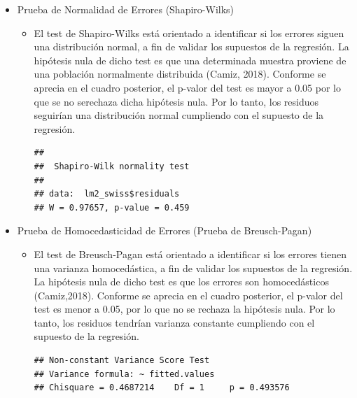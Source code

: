 \documentclass[10pt,a4paper]{article}\usepackage[]{graphicx}\usepackage[]{color}
\makeatletter
\newenvironment{kframe}{%
 \def\at@end@of@kframe{}%
 \ifinner\ifhmode%
  \def\at@end@of@kframe{\end{minipage}}%
  \begin{minipage}{\columnwidth}%
 \fi\fi%
 \def\FrameCommand##1{\hskip\@totalleftmargin \hskip-\fboxsep
 \colorbox{shadecolor}{##1}\hskip-\fboxsep
     \hskip-\linewidth \hskip-\@totalleftmargin \hskip\columnwidth}%
 \MakeFramed {\advance\hsize-\width
   \@totalleftmargin\z@ \linewidth\hsize
   \@setminipage}}%
 {\par\unskip\endMakeFramed%
 \at@end@of@kframe}
\newenvironment{knitrout}{}{} %
\makeatother
\begin{document}
\begin{itemize}
  \item Prueba de Normalidad de Errores (Shapiro-Wilks)
    \begin{itemize}
      \item El test de Shapiro-Wilks está orientado a identificar si los errores siguen una distribución normal, a fin de validar los supuestos de la regresión. La hipótesis nula de dicho test es que una determinada muestra proviene de una población normalmente distribuida (Camiz, 2018). Conforme se aprecia en el cuadro posterior, el p-valor del test es mayor a 0.05 por lo que se no serechaza dicha hipótesis nula. Por lo tanto, los residuos seguirían una distribución normal cumpliendo con el supuesto de la regresión.
\begin{knitrout}
\color{fgcolor}\begin{kframe}
\begin{verbatim}
## 
## 	Shapiro-Wilk normality test
## 
## data:  lm2_swiss$residuals
## W = 0.97657, p-value = 0.459
\end{verbatim}
\end{kframe}
\end{knitrout}
    \end{itemize}  
  \item Prueba de Homocedasticidad de Errores (Prueba de Breusch-Pagan)
    \begin{itemize}
      \item El test de Breusch-Pagan está orientado a identificar si los errores tienen una varianza homocedástica, a fin de validar los supuestos de la regresión. La hipótesis nula de dicho test es que los errores son homocedásticos (Camiz,2018). Conforme se aprecia en el cuadro posterior, el p-valor del test es menor a 0.05, por lo que no se rechaza la hipótesis nula. Por lo tanto, los residuos tendrían varianza constante cumpliendo con el supuesto de la regresión.
\begin{knitrout}
\color{fgcolor}\begin{kframe}
\begin{verbatim}
## Non-constant Variance Score Test 
## Variance formula: ~ fitted.values 
## Chisquare = 0.4687214    Df = 1     p = 0.493576
\end{verbatim}
\end{kframe}
\end{knitrout}
    \end{itemize}
\end{itemize}
\end{document}
